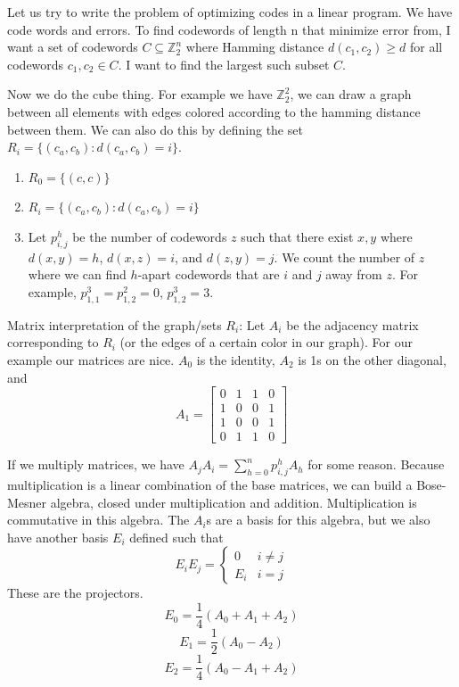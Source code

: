 \documentclass[12pt]{article}
\theoremstyle{remark}
\begin{document}
Let us try to write the problem of optimizing codes in a linear program. We have code words and errors. To find codewords of length n that minimize error from, I want a set of codewords $C\subseteq \mathbb{Z}_2^n$ where Hamming distance $d(c_1,c_2) \ge d$ for all codewords $c_1,c_2\in C$. I want to find the largest such subset $C$.

Now we do the cube thing. For example we have $\mathbb{Z}_2^2$, we can draw a graph between all elements with edges colored according to the hamming distance between them. We can also do this by defining the set $R_i = \{(c_a,c_b):d(c_a,c_b)=i\}$.

\begin{enumerate}
    \item $R_0 = \{(c,c)\}$
    \item $R_i = \{(c_a,c_b):d(c_a,c_b)=i\}$
    \item Let $p_{i,j}^h$ be the number of codewords $z$ such that there exist $x,y$ where $d(x,y)=h$, $d(x,z)=i$, and $d(z,y)=j$. We count the number of $z$ where we can find $h$-apart codewords that are $i$ and $j$ away from $z$. For example, $p^3_{1,1}=p^2_{1,2}=0$, $p^3_{1,2}=3$.
\end{enumerate}

Matrix interpretation of the graph/sets $R_i$:
Let $A_i$ be the adjacency matrix corresponding to $R_i$ (or the edges of a certain color in our graph). For our example our matrices are nice. $A_0$ is the identity, $A_2$ is 1s on the other diagonal, and 
\[A_1 = \begin{bmatrix}
    0 & 1 & 1 & 0 \\ 1 & 0 & 0 & 1 \\ 1 & 0 & 0 & 1 \\ 0 & 1 & 1 & 0
\end{bmatrix}\]

If we multiply matrices, we have $A_jA_i = \sum_{h=0}^n p_{i,j}^h A_h$ for some reason. Because multiplication is a linear combination of the base matrices, we can build a Bose-Mesner algebra, closed under multiplication and addition. Multiplication is commutative in this algebra. The $A_i$s are a basis for this algebra, but we also have another basis $E_i$ defined such that
\[E_iE_j = \begin{cases}
    0 & i\ne j \\
    E_i & i = j
\end{cases}\]
These are the projectors.
\[E_0 = \frac{1}{4}(A_0 + A_1+A_2)\]
\[E_1 = \frac{1}{2}(A_0 - A_2)\]
\[E_2 = \frac{1}{4} (A_0 - A_1 + A_2)\]
\end{document}

